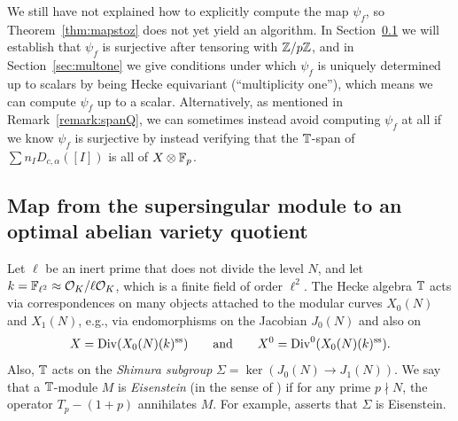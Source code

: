 \documentclass{article} \usepackage[active]{srcltx}
\renewcommand{\O}{\mathcal{O}}
\DeclareMathOperator{\supersingular}{ss}
\renewcommand{\ss}{\supersingular}
\begin{document}
We still have not explained how to explicitly compute the map
$\psi_f$, so Theorem~\ref{thm:mapstoz} does not yet yield an
algorithm.  In Section~\ref{sec:surjss} we will establish that
$\psi_f$ is surjective after tensoring with $\mathbb{Z}/p\mathbb{Z}$, and in
Section~\ref{sec:multone} we give conditions under which $\psi_f$ is
uniquely determined up to scalars by being Hecke equivariant
(``multiplicity one''), which means we can compute $\psi_f$ up to a
scalar.  Alternatively, as mentioned in Remark~\ref{remark:spanQ}, we
can sometimes instead avoid computing $\psi_f$ at all if we know
$\psi_f$ is surjective by instead verifying that the $\mathbb{T}$-span of
$\sum n_I D_{c,\alpha}([I])$ is all of $X \otimes \mathbb{F}_p$.

\subsection{Map from the supersingular
  module to an optimal abelian variety quotient}\label{sec:surjss}

Let $\ell$ be an inert prime that does not divide the level $N$, and
let $k=\F_{\ell^2}\ncisom \O_K/\ell\O_K$, which is a finite field of order
$\ell^2$.  The Hecke algebra $\mathbb{T}$ acts via correspondences on many
objects attached to the modular curves $X_0(N)$ and $X_1(N)$, e.g.,
via endomorphisms on the Jacobian $J_0(N)$ and also on
\begin{equation}\label{eqn:X}
X = \Div(X_0(N)(k)^{\ss}) \qquad\text{and}\qquad
X^0 = \Div^0(X_0(N)(k)^{\ss}).
\end{equation}
Also, $\mathbb{T}$ acts on the {\em Shimura
subgroup} $\Sigma = \ker(J_0(N) \to J_1(N))$.  We say that a $\mathbb{T}$-module $M$
is {\em Eisenstein} (in the sense of \cite{mazur:eisenstein}) if for
any prime $p\nmid N$, the operator $T_p-(1+p)$ annihilates $M$.  For
example, \cite[Thm.~1]{ribet:comp} asserts that $\Sigma$ is
Eisenstein.  
\end{document}
